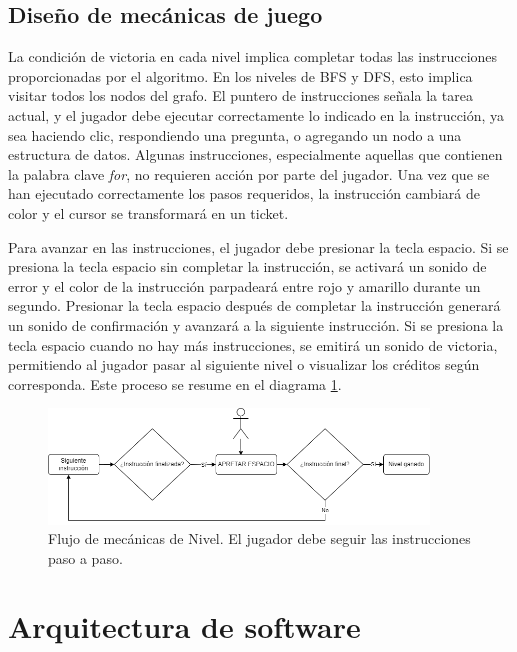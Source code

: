 \subsection{Diseño de mecánicas de juego}

La condición de victoria en cada nivel implica completar todas las instrucciones proporcionadas por el algoritmo. En los niveles de BFS y DFS, esto implica visitar todos los nodos del grafo. El puntero de instrucciones señala la tarea actual, y el jugador debe ejecutar correctamente lo indicado en la instrucción, ya sea haciendo clic, respondiendo una pregunta, o agregando un nodo a una estructura de datos. Algunas instrucciones, especialmente aquellas que contienen la palabra clave \textit{for}, no requieren acción por parte del jugador. Una vez que se han ejecutado correctamente los pasos requeridos, la instrucción cambiará de color y el cursor se transformará en un ticket.

Para avanzar en las instrucciones, el jugador debe presionar la tecla espacio. Si se presiona la tecla espacio sin completar la instrucción, se activará un sonido de error y el color de la instrucción parpadeará entre rojo y amarillo durante un segundo. Presionar la tecla espacio después de completar la instrucción generará un sonido de confirmación y avanzará a la siguiente instrucción. Si se presiona la tecla espacio cuando no hay más instrucciones, se emitirá un sonido de victoria, permitiendo al jugador pasar al siguiente nivel o visualizar los créditos según corresponda. Este proceso se resume en el diagrama \ref{FlujoMecanicaDeNivel}.

\begin{figure}[h]
	\centering
	\includegraphics[width=0.9\textwidth]{imagenes/FlujoDeMecanicasDeNivel.drawio.png}
	\caption{Flujo de mecánicas de Nivel. El jugador debe seguir las instrucciones paso a paso.}
	\label{FlujoMecanicaDeNivel}
\end{figure}



\section{Arquitectura de software}

